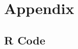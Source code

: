 \documentclass[12pt]{article}
\begin{document}











\newpage
\section{Appendix}
\subsection{R Code}
\begin{tiny}

\end{tiny}
\end{document}
